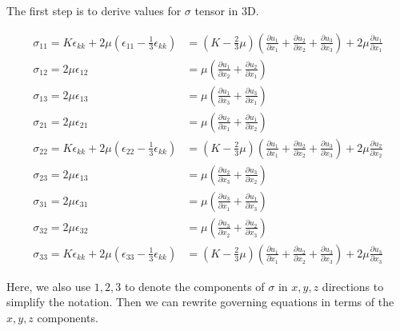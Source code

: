 The first step is to derive values for $\sigma$ tensor in 3D.

\begin{align}
    \sigma_{11} = K\epsilon_{kk} + 2\mu (\epsilon_{11} - \frac{1}{3}\epsilon_{kk}) &= (K - \frac{2}{3}\mu)( \frac{\partial u_1}{\partial x_1} + \frac{\partial u_2}{\partial x_2} + \frac{\partial u_3}{\partial x_3}) + 2\mu \frac{\partial u_1}{\partial x_1} \\
    \sigma_{12} = 2\mu \epsilon_{12} &= \mu(\frac{\partial u_1}{\partial x_2} + \frac{\partial u_2}{\partial x_1}) \\
    \sigma_{13} = 2\mu \epsilon_{13} &= \mu(\frac{\partial u_1}{\partial x_3} + \frac{\partial u_3}{\partial x_1}) \\
    \sigma_{21} = 2\mu \epsilon_{21} &= \mu(\frac{\partial u_2}{\partial x_1} + \frac{\partial u_1}{\partial x_2}) \\
    \sigma_{22} = K\epsilon_{kk} + 2\mu (\epsilon_{22} - \frac{1}{3}\epsilon_{kk}) &= (K - \frac{2}{3}\mu)( \frac{\partial u_1}{\partial x_1} + \frac{\partial u_2}{\partial x_2} + \frac{\partial u_3}{\partial x_3}) + 2\mu \frac{\partial u_2}{\partial x_2} \\
    \sigma_{23} = 2\mu \epsilon_{13} &= \mu(\frac{\partial u_2}{\partial x_3} + \frac{\partial u_3}{\partial x_2}) \\
    \sigma_{31} = 2\mu \epsilon_{31} &= \mu(\frac{\partial u_3}{\partial x_1} + \frac{\partial u_1}{\partial x_3}) \\
    \sigma_{32} = 2\mu \epsilon_{32} &= \mu(\frac{\partial u_3}{\partial x_2} + \frac{\partial u_2}{\partial x_3}) \\
    \sigma_{33} = K\epsilon_{kk} + 2\mu (\epsilon_{33} - \frac{1}{3}\epsilon_{kk}) &= (K - \frac{2}{3}\mu)( \frac{\partial u_1}{\partial x_1} + \frac{\partial u_2}{\partial x_2} + \frac{\partial u_3}{\partial x_3}) + 2\mu \frac{\partial u_3}{\partial x_3}
    \label{eqn:sigma-tensor}
\end{align}


Here, we also use $1,2,3$ to denote the components of $\sigma$ in $x,y,z$ directions to simplify the notation.
Then we can rewrite governing equations in terms of the $x,y,z$ components.

